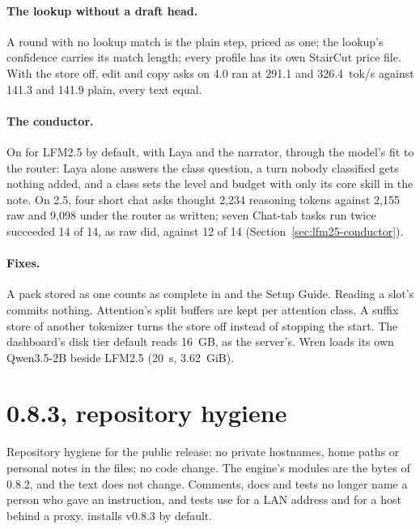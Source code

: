 \paragraph{The lookup without a draft head.} A round with no lookup match is the plain step, priced as one; the lookup's confidence carries its match length; every profile has its own StairCut price file. With the store off, edit and copy asks on 4.0 ran at 291.1 and 326.4~tok/s against 141.3 and 141.9 plain, every text equal.

\paragraph{The conductor.} On for LFM2.5 by default, with Laya and the narrator, through the model's fit to the router: Laya alone answers the class question, a turn nobody classified gets nothing added, and a class sets the level and budget with only its core skill in the note. On 2.5, four short chat asks thought 2,234 reasoning tokens against 2,155 raw and 9,098 under the router as written; seven Chat-tab tasks run twice succeeded 14 of 14, as raw did, against 12 of 14 (Section~\ref{sec:lfm25-conductor}).

\paragraph{Fixes.} A pack stored as one  counts as complete in  and the Setup Guide. Reading a slot's  commits nothing. Attention's split buffers are kept per attention class. A suffix store of another tokenizer turns the store off instead of stopping the start. The dashboard's disk tier default reads 16~GB, as the server's. Wren loads its own Qwen3.5-2B beside LFM2.5 (20~s, 3.62~GiB).

\section{0.8.3, repository hygiene}\label{sec:changelog-083}

Repository hygiene for the public release: no private hostnames, home paths or personal notes in the files; no code change. The engine's modules are the bytes of 0.8.2, and the text does not change. Comments, docs and tests no longer name a person who gave an instruction, and tests use  for a LAN address and  for a host behind a proxy.  installs v0.8.3 by default.

